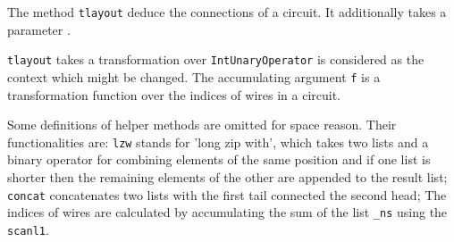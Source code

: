 The method \texttt{tlayout} deduce the connections of a circuit. It additionally
takes a parameter \texttt{}.


\texttt{tlayout} takes a transformation over \texttt{IntUnaryOperator} is considered as the context which might be changed.
The accumulating argument \texttt{f} is a transformation function over the indices of wires in a circuit.

Some definitions of helper methods are omitted for space reason.
Their functionalities are: \texttt{lzw} stands for 'long zip with', which takes two lists and a binary operator for
combining elements of the same position and if one list is shorter then the
remaining elements of the other are appended to the result list; \texttt{concat}
concatenates two lists with the first tail connected the second head;
The indices of wires are calculated by accumulating the sum of the list \texttt{\_ns} using the \texttt{scanl1}.


